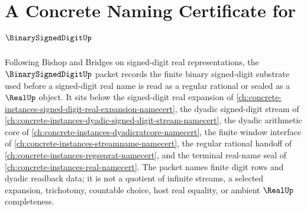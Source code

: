 \chapter{A Concrete Naming Certificate for $\BinarySignedDigitUp$}
\label{ch:concrete-instances-binary-signed-digit-namecert}

Following Bishop and Bridges on signed-digit real representations, the $\BinarySignedDigitUp$ packet records the finite binary signed-digit substrate used before a signed-digit real name is read as a regular rational or sealed as a $\RealUp$ object. It sits below the signed-digit real expansion of \autoref{ch:concrete-instances-signed-digit-real-expansion-namecert}, the dyadic signed-digit stream of \autoref{ch:concrete-instances-dyadic-signed-digit-stream-namecert}, the dyadic arithmetic core of \autoref{ch:concrete-instances-dyadicratcore-namecert}, the finite window interface of \autoref{ch:concrete-instances-streamname-namecert}, the regular rational handoff of \autoref{ch:concrete-instances-regseqrat-namecert}, and the terminal real-name seal of \autoref{ch:concrete-instances-real-namecert}. The packet names finite digit rows and dyadic readback data; it is not a quotient of infinite streams, a selected expansion, trichotomy, countable choice, host real equality, or ambient $\RealUp$ completeness.

